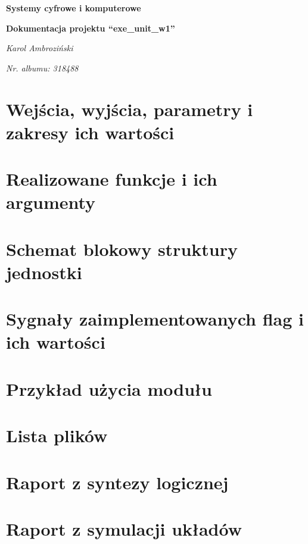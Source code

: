 \documentclass[12pt]{article}
\title{}
\author{}
\date{}
\begin{document}
	\begin{titlepage}
		\centering
		\vspace{1cm}
		{\huge\bfseries Systemy cyfrowe i komputerowe\par}
		\vspace{0.5cm}
		{\huge\bfseries Dokumentacja projektu ``exe\_unit\_w1''\par}
		\vspace{2cm}
		{\Large\itshape Karol Ambroziński\par}
		\vspace{0cm}
		{\Large\itshape Nr. albumu: 318488\par}
		\vfill
	\end{titlepage}

	\tableofcontents
	
	\newpage
	
	\section{Wejścia, wyjścia, parametry i zakresy ich wartości}
	
	
	
	\section{Realizowane funkcje i ich argumenty}

	
	
	\section{Schemat blokowy struktury jednostki}
	
	
	
	\section{Sygnały zaimplementowanych flag i ich wartości}
	
	

	\newpage

	\section{Przykład użycia modułu}
	\blindtext
	\section{Lista plików}
	\blindtext
	\section{Raport z syntezy logicznej}
	\blindtext
	\section{Raport z symulacji układów}
	\blindtext
	
\end{document}
